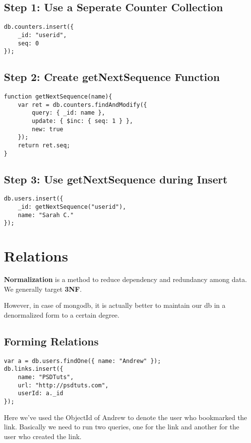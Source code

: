 \documentclass[a4paper, 12pt]{article}
\begin{document}
\subsection{Step 1: Use a Seperate Counter Collection}
\begin{verbatim}
db.counters.insert({
    _id: "userid",
    seq: 0
});
\end{verbatim}
\subsection{Step 2: Create getNextSequence Function}
\begin{verbatim}
function getNextSequence(name){
    var ret = db.counters.findAndModify({
        query: { _id: name },
        update: { $inc: { seq: 1 } },
        new: true
    });
    return ret.seq;
}
\end{verbatim}
\subsection{Step 3: Use getNextSequence during Insert}
\begin{verbatim}
db.users.insert({
    _id: getNextSequence("userid"),
    name: "Sarah C."
});
\end{verbatim}

\section{Relations}
\textbf{Normalization} is a method to reduce dependency and redundancy among data. We generally target \textbf{3NF}.

However, in case of mongodb, it is actually better to maintain our db in a denormalized form to a certain degree.
\subsection{Forming Relations}
\begin{verbatim}
var a = db.users.findOne({ name: "Andrew" });
db.links.insert({
    name: "PSDTuts",
    url: "http://psdtuts.com",
    userId: a._id
});
\end{verbatim}
Here we've used the ObjectId of Andrew to denote the user who bookmarked the link. Basically we need to run two queries, one for the link and another for the user who created the link.
\end{document}
